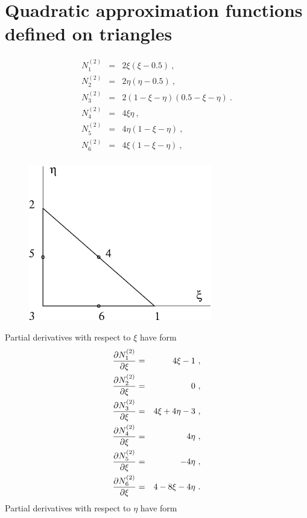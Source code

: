 \section{Quadratic approximation functions defined on triangles}
\begin{eqnarray}
\label{bfquadtrn1}
N_1^{(2)} &=& 2\xi(\xi-0.5)\ ,
\\
\label{bfquadtrn2}
N_2^{(2)} &=& 2\eta(\eta-0.5)\ ,
\\
\label{bfquadtrn3}
N_3^{(2)} &=& 2(1 - \xi - \eta)(0.5-\xi-\eta)\ .
\\
\label{bfquadtrn4}
N_4^{(2)} &=& 4 \xi \eta \ ,
\\
\label{bfquadtrn5}
N_5^{(2)} &=& 4 \eta (1 - \xi - \eta)\ ,
\\
\label{bfquadtrn6}
N_6^{(2)} &=& 4 \xi (1 - \xi - \eta)\ ,
\\
\end{eqnarray}
\begin{figure}
\begin{center}
\includegraphics[width=80mm]{FIG/quadtriang.eps}
\end{center}
\end{figure}
Partial derivatives with respect to $\xi$ have form
\begin{eqnarray}
\label{bfquadtrdx1}
\mbox{$\displaystyle\frac{\partial{N_1^{(2)}}}{\partial{\xi}}$} &=& 4 \xi - 1\ ,
\\
\label{bfquadtrdx2}
\mbox{$\displaystyle\frac{\partial{N_2^{(2)}}}{\partial{\xi}}$} &=& 0\ ,
\\
\label{bfquadtrdx3}
\mbox{$\displaystyle\frac{\partial{N_3^{(2)}}}{\partial{\xi}}$} &=& 4 \xi + 4 \eta - 3\ ,
\\
\label{bfquadtrdx4}
\mbox{$\displaystyle\frac{\partial{N_4^{(2)}}}{\partial{\xi}}$} &=& 4 \eta\ ,
\\
\label{bfquadtrdx5}
\mbox{$\displaystyle\frac{\partial{N_5^{(2)}}}{\partial{\xi}}$} &=& -4 \eta\ ,
\\
\label{bfquadtrdx6}
\mbox{$\displaystyle\frac{\partial{N_6^{(2)}}}{\partial{\xi}}$} &=& 4 - 8 \xi - 4 \eta\ .
\end{eqnarray}
Partial derivatives with respect to $\eta$ have form
